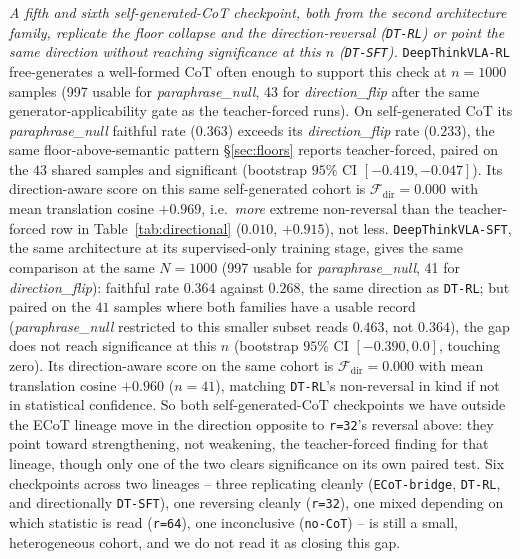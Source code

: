 \emph{A fifth and sixth self-generated-CoT checkpoint, both from the second architecture family, replicate the floor collapse and the direction-reversal (\texttt{DT-RL}) or point the same direction without reaching significance at this $n$ (\texttt{DT-SFT}).} \texttt{DeepThinkVLA-RL} free-generates a well-formed CoT often enough to support this check at $n{=}1000$ samples (997 usable for \emph{paraphrase\_null}, 43 for \emph{direction\_flip} after the same generator-applicability gate as the teacher-forced runs). On self-generated CoT its \emph{paraphrase\_null} faithful rate ($0.363$) exceeds its \emph{direction\_flip} rate ($0.233$), the same floor-above-semantic pattern \S\ref{sec:floors} reports teacher-forced, paired on the $43$ shared samples and significant (bootstrap $95\%$ CI $[-0.419, -0.047]$). Its direction-aware score on this same self-generated cohort is $\mathcal{F}_{\text{dir}}{=}0.000$ with mean translation cosine $+0.969$, i.e.\ \emph{more} extreme non-reversal than the teacher-forced row in Table~\ref{tab:directional} ($0.010$, $+0.915$), not less. \texttt{DeepThinkVLA-SFT}, the same architecture at its supervised-only training stage, gives the same comparison at the same $N{=}1000$ (997 usable for \emph{paraphrase\_null}, 41 for \emph{direction\_flip}): faithful rate $0.364$ against $0.268$, the same direction as \texttt{DT-RL}; but paired on the $41$ samples where both families have a usable record (\emph{paraphrase\_null} restricted to this smaller subset reads $0.463$, not $0.364$), the gap does not reach significance at this $n$ (bootstrap $95\%$ CI $[-0.390, 0.0]$, touching zero). Its direction-aware score on the same cohort is $\mathcal{F}_{\text{dir}}{=}0.000$ with mean translation cosine $+0.960$ ($n{=}41$), matching \texttt{DT-RL}'s non-reversal in kind if not in statistical confidence. So both self-generated-CoT checkpoints we have outside the ECoT lineage move in the direction opposite to \texttt{r=32}'s reversal above: they point toward strengthening, not weakening, the teacher-forced finding for that lineage, though only one of the two clears significance on its own paired test. Six checkpoints across two lineages -- three replicating cleanly (\texttt{ECoT-bridge}, \texttt{DT-RL}, and directionally \texttt{DT-SFT}), one reversing cleanly (\texttt{r=32}), one mixed depending on which statistic is read (\texttt{r=64}), one inconclusive (\texttt{no-CoT}) -- is still a small, heterogeneous cohort, and we do not read it as closing this gap.

